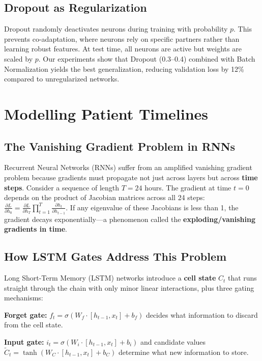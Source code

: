 \documentclass[11pt,a4paper]{article}
\begin{document}
\subsection{Dropout as Regularization}

Dropout randomly deactivates neurons during training with probability $p$. This prevents co-adaptation, where neurons rely on specific partners rather than learning robust features. At test time, all neurons are active but weights are scaled by $p$. Our experiments show that Dropout (0.3--0.4) combined with Batch Normalization yields the best generalization, reducing validation loss by 12\% compared to unregularized networks.

\section{Modelling Patient Timelines}

\subsection{The Vanishing Gradient Problem in RNNs}

Recurrent Neural Networks (RNNs) suffer from an amplified vanishing gradient problem because gradients must propagate not just across layers but across \textbf{time steps}. Consider a sequence of length $T=24$ hours. The gradient at time $t=0$ depends on the product of Jacobian matrices across all 24 steps: $\frac{\partial L}{\partial h_0} = \frac{\partial L}{\partial h_T} \prod_{t=1}^T \frac{\partial h_t}{\partial h_{t-1}}$. If any eigenvalue of these Jacobians is less than 1, the gradient decays exponentially---a phenomenon called the \textbf{exploding/vanishing gradients in time}.

\subsection{How LSTM Gates Address This Problem}

Long Short-Term Memory (LSTM) networks introduce a \textbf{cell state} $C_t$ that runs straight through the chain with only minor linear interactions, plus three gating mechanisms:

\textbf{Forget gate:} $f_t = \sigma(W_f \cdot [h_{t-1}, x_t] + b_f)$ decides what information to discard from the cell state.

\textbf{Input gate:} $i_t = \sigma(W_i \cdot [h_{t-1}, x_t] + b_i)$ and candidate values $\tilde{C}_t = \tanh(W_C \cdot [h_{t-1}, x_t] + b_C)$ determine what new information to store.
\end{document}
